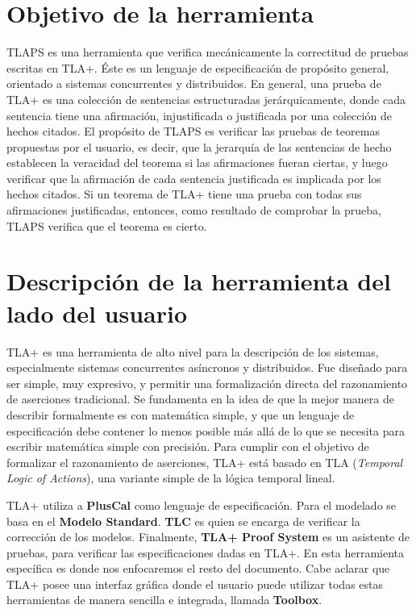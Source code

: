 \documentclass[spanish]{llncs}
\begin{document}


\section{Objetivo de la herramienta}

TLAPS es una herramienta que verifica mecánicamente la correctitud de pruebas escritas en TLA+.
Éste es un lenguaje de especificación de propósito general, orientado a sistemas concurrentes y distribuidos\cite{highlevel}.
En general, una prueba de TLA+ es una colección de sentencias estructuradas jerárquicamente,
donde cada sentencia tiene una afirmación, injustificada o justificada por una colección de hechos citados.
El propósito de TLAPS es verificar las pruebas de teoremas propuestas por el usuario, es decir,
que la jerarquía de las sentencias de hecho establecen la veracidad del teorema si las afirmaciones fueran ciertas,
y luego verificar que la afirmación de cada sentencia justificada es implicada por los hechos citados\cite{tlaps}.
Si un teorema de TLA+ tiene una prueba con todas sus afirmaciones justificadas, entonces, como resultado
de comprobar la prueba, TLAPS verifica que el teorema es cierto.

\section{Descripción de la herramienta del lado del usuario}

TLA+ es una herramienta de alto nivel para la descripción de los sistemas, especialmente sistemas concurrentes asíncronos y distribuidos. 
Fue diseñado para ser simple, muy expresivo, y permitir una formalización directa del razonamiento de aserciones tradicional.
Se fundamenta en la idea de que la mejor manera de describir formalmente es con matemática simple, y que un lenguaje de especificación debe contener lo menos posible más allá de lo que se necesita para escribir matemática simple con precisión.
Para cumplir con el objetivo de formalizar el razonamiento de aserciones, TLA+ está basado en TLA (\textit{Temporal Logic of Actions}), una variante simple de la lógica temporal lineal.

TLA+ utiliza a \textbf{PlusCal} como lenguaje de especificación.
Para el modelado se basa en el \textbf{Modelo Standard}.
\textbf{TLC} es quien se encarga de verificar la corrección de los modelos.
Finalmente, \textbf{TLA+ Proof System} es un asistente de pruebas, para verificar las especificaciones dadas en TLA+. 
En esta herramienta específica es donde nos enfocaremos el resto del documento. 
Cabe aclarar que TLA+ posee una interfaz gráfica donde el usuario puede utilizar todas estas herramientas de manera sencilla e integrada, llamada \textbf{Toolbox}.
  
\end{document}
